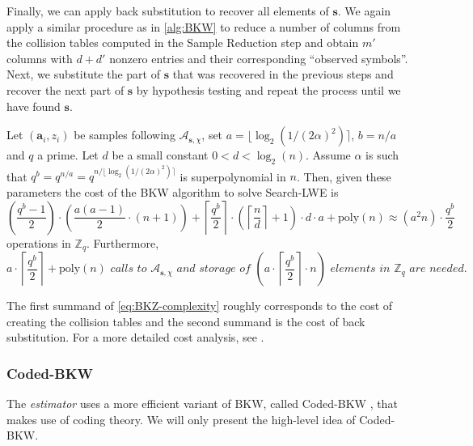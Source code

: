 
Finally, we can apply back substitution to recover all elements of $\mathbf{s}$. We again apply a similar procedure as in \cref{alg:BKW} to reduce a number of columns from the collision  tables computed in the Sample Reduction step and obtain $m'$ columns with $d+d'$ nonzero entries and their corresponding ``observed symbols''. Next, we substitute the part of $\mathbf{s}$ that was recovered in the previous steps and recover the next part of $\mathbf{s}$ by hypothesis testing and repeat the process until we have found $\mathbf{s}$.


\begin{theorem}
  Let $(\mathbf{a}_i, z_i)$ be samples following $\mathcal{A}_{\mathbf{s}, \chi}$, set $a = \lfloor \log_2(1/(2\alpha)^2)\rceil$, $b = n/a$ and $q$ a prime. Let $d$ be a small constant $0 < d < \log_2(n)$. Assume $\alpha$ is such that $q^b = q^{n/a} = q^{n/\lfloor \log_2(1/(2\alpha)^2)\rceil}$ is superpolynomial in $n$. Then, given these parameters the cost of the BKW algorithm to solve Search-LWE is
  \begin{equation}\label{eq:BKZ-complexity}
    \left(\frac{q^b-1}{2}\right) \cdot \left(\frac{a(a-1)}{2} \cdot (n + 1) \right) + \left\lceil\frac{q^b}{2}\right\rceil \cdot \left(\left\lceil\frac{n}{d}\right\rceil + 1\right) \cdot d \cdot a + \text{poly}(n) \approx (a^2 n) \cdot \frac{q^b}{2}
  \end{equation}
  operations in $\mathbb{Z}_q$. Furthermore,
  \begin{equation}
    a \cdot \left\lceil\frac{q^b}{2}\right\rceil + \text{poly}(n)\textit{ calls to } \mathcal{A}_{\mathbf{s}, \chi}\textit{ and storage of }  \left(a \cdot \left\lceil\frac{q^b}{2}\right\rceil \cdot n\right) \textit{ elements in } \mathbb{Z}_q \textit{ are needed.}
  \end{equation}
\end{theorem}

The first summand of \cref{eq:BKZ-complexity} roughly corresponds to the cost of creating the collision  tables and the second summand is the cost of back substitution. For a more detailed cost analysis, see \cite[Theorem~2]{ACFFP15a}.


\subsubsection*{Coded-BKW \cite{GJS15}}
The \textit{estimator} uses a more efficient variant of BKW, called Coded-BKW \cite{GJS15}, that makes use of coding theory. We will only present the high-level idea of Coded-BKW.

